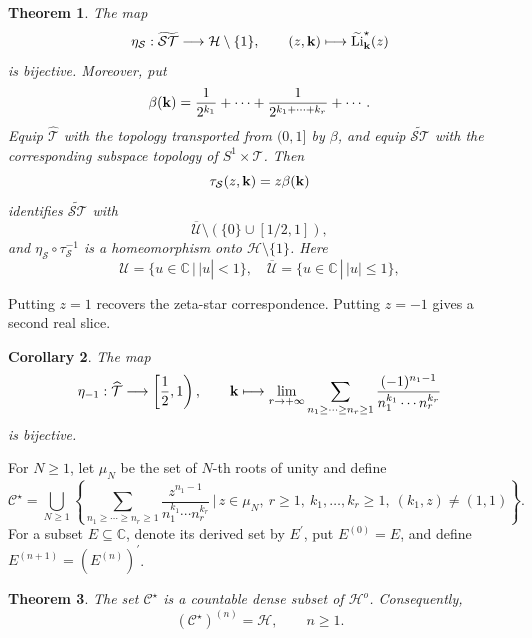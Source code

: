 \documentclass[12pt,a4paper]{amsart}
\numberwithin{equation}{section}
\theoremstyle{plain}
\newtheorem{Thm}{Theorem}[section]
\newtheorem{Cor}[Thm]{Corollary}
\theoremstyle{definition}
\begin{document}
\begin{Thm}\label{one}
The map
\[
\eta_{\mathcal{S}}:\widetilde{\mathcal{ST}}\longrightarrow\mathcal{H}\setminus\{1\},
\qquad
(z,{\bf k})\longmapsto
\widetilde{\mathrm{Li}}^{\star}_{\bf k}(z)
\]
is bijective.
Moreover, put
\[
\beta({\bf k})=\frac{1}{2^{k_1}}+\cdots+\frac{1}{2^{k_1+\cdots +k_r}}+\cdots.
\]
Equip $\widehat{\mathcal{T}}$ with the topology transported from $(0,1]$ by $\beta$, and equip $\widetilde{\mathcal{ST}}$ with the corresponding subspace topology of $S^1\times\widehat{\mathcal{T}}$.  Then
\[
\tau_{\mathcal{S}}(z,{\bf k})=z\beta({\bf k})
\]
identifies $\widetilde{\mathcal{ST}}$ with
\[
\overline{\mathcal{U}}\setminus\left(\{0\}\cup\left[1/2,1\right]\right),
\]
and $\eta_{\mathcal{S}}\circ\tau_{\mathcal{S}}^{-1}$ is a homeomorphism onto $\mathcal{H}\setminus\{1\}$.
Here 
\[
\mathcal{U}=\{u\in\mathbb{C}\,|\,|u|< 1\},\quad \overline{\mathcal{U}}=\{u\in\mathbb{C}\,|\,|u|\leq 1\},
\]
\end{Thm}

Putting $z=1$ recovers the zeta-star correspondence.  Putting $z=-1$ gives a second real slice.

\begin{Cor}\label{minusone}
The map
\[
\eta_{-1}:\widehat{\mathcal{T}}\longrightarrow\left[\frac12,1\right),
\qquad
{\bf k}\longmapsto
\lim_{r\rightarrow+\infty}
\sum_{n_1\geq\cdots\geq n_r\geq 1}
\frac{(-1)^{n_1-1}}{n_1^{k_1}\cdots n_r^{k_r}}
\]
is bijective.
\end{Cor}

For $N\geq 1$, let $\mu_N$ be the set of $N$-th roots of unity and define
\[
\mathcal{C}^{\star}=
\bigcup_{N\geq1}\left\{
\sum_{n_1\geq\cdots\geq n_r\geq 1}
\frac{z^{n_1-1}}{n_1^{k_1}\cdots n_r^{k_r}}
\,\bigg|\,
 z\in\mu_N,\ r\geq 1,\ k_1,\ldots,k_r\geq1,\ (k_1,z)\neq(1,1)
\right\}.
\]
For a subset $E\subseteq\mathbb{C}$, denote its derived set by $E^{\prime}$, put $E^{(0)}=E$, and define $E^{(n+1)}=(E^{(n)})^{\prime}$.

\begin{Thm}\label{cyc}
The set $\mathcal{C}^{\star}$ is a countable dense subset of $\mathcal{H}^{o}$.  Consequently,
\[
(\mathcal{C}^{\star})^{(n)}=\mathcal{H},
\qquad n\geq 1.
\]
\end{Thm}
\end{document}
